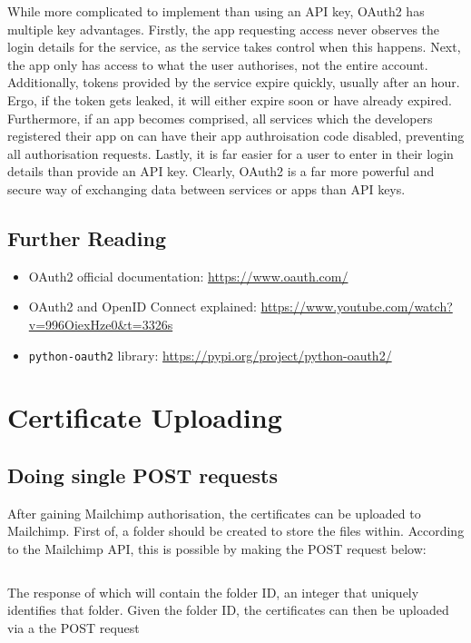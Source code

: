\documentclass[11pt]{article}
\begin{document}
While more complicated to implement than using an API key, OAuth2 has multiple key advantages. Firstly, the app requesting access never observes the login details for the service, as the service takes control when this happens. Next, the app only has access to what the user authorises, not the entire account. Additionally, tokens provided by the service expire quickly, usually after an hour. Ergo, if the token gets leaked, it will either expire soon or have already expired. Furthermore, if an app becomes comprised, all services which the developers registered their app on can have their app authroisation code disabled, preventing all authorisation requests. Lastly, it is far easier for a user to enter in their login details than provide an API key. Clearly, OAuth2 is a far more powerful and secure way of exchanging data between services or apps than API keys.

\subsection{Further Reading}

\begin{itemize}
    \item OAuth2 official documentation: \url{https://www.oauth.com/}
    \item OAuth2 and OpenID Connect explained: \url{https://www.youtube.com/watch?v=996OiexHze0&t=3326s}
    \item \texttt{python-oauth2} library: \url{https://pypi.org/project/python-oauth2/}
\end{itemize}

\newpage

\section{Certificate Uploading}

\subsection{Doing single POST requests}

After gaining Mailchimp authorisation, the certificates can be uploaded to Mailchimp. First of, a folder should be created to store the files within. According to the Mailchimp API, this is possible by making the POST request below:

\inputminted[linenos=true]{python}{mailchimp_examples/create_folder.py}

\noindent
The response of which will contain the folder ID, an integer that uniquely identifies that folder. Given the folder ID, the certificates can then be uploaded via a the POST request
\end{document}
